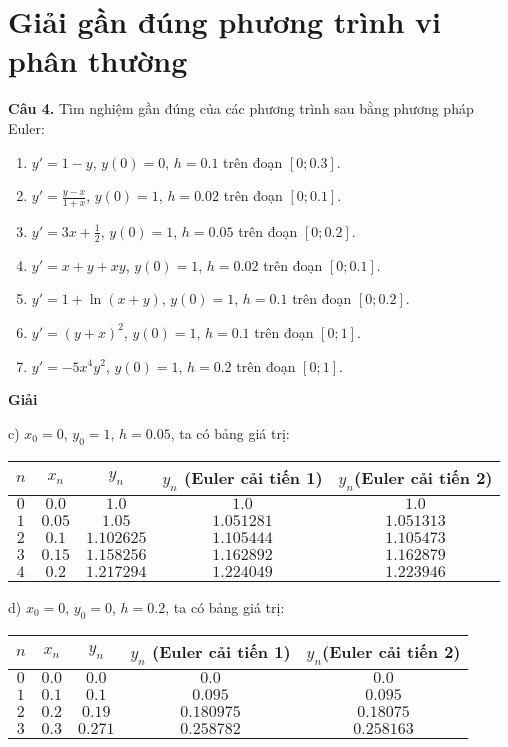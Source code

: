 \chapter{Giải gần đúng phương trình vi phân thường}

\textbf{Câu 4.} Tìm nghiệm gần đúng của các phương trình sau bằng phương pháp Euler:
\begin{enumerate}[label=\alph*)]
	\item $y'=1-y$, $y(0)=0$, $h=0.1$ trên đoạn $[0;0.3]$.
	\item $y'=\frac{y-x}{1+x}$, $y(0)=1$, $h=0.02$ trên đoạn $[0;0.1]$.
	\item $y'=3x+\frac12$, $y(0)=1$, $h=0.05$ trên đoạn $[0;0.2]$.
	\item $y'=x+y+xy$, $y(0)=1$, $h=0.02$ trên đoạn $[0;0.1]$.
	\item $y'=1+\ln(x+y)$, $y(0)=1$, $h=0.1$ trên đoạn $[0;0.2]$.
	\item $y'=(y+x)^2$, $y(0)=1$, $h=0.1$ trên đoạn $[0;1]$.
	\item $y'=-5x^4y^2$, $y(0)=1$, $h=0.2$ trên đoạn $[0;1]$.
\end{enumerate}

\textbf{Giải}\par

c) $x_0=0$, $y_0=1$, $h=0.05$, ta có bảng giá trị:
\begin{longtable}{|c|c|c|c|c|}\hline
$n$ & $x_n$ & $y_n$ & $y_n$ (Euler cải tiến 1) & $y_n$(Euler cải tiến 2) \\ \hline
$0$ & $0.0$ & $1.0$ & $1.0$ & $1.0$ \\ \hline
$1$ & $0.05$ & $1.05$ & $1.051281$ & $1.051313$ \\ \hline
$2$ & $0.1$ & $1.102625$ & $1.105444$ & $1.105473$ \\ \hline
$3$ & $0.15$ & $1.158256$ & $1.162892$ & $1.162879$ \\ \hline
$4$ & $0.2$ & $1.217294$ & $1.224049$ & $1.223946$ \\ \hline
\end{longtable}
d) $x_0=0$, $y_0=0$, $h=0.2$, ta có bảng giá trị:

\begin{longtable}{|c|c|c|c|c|}\hline
	$n$ & $x_n$ & $y_n$ & $y_n$ (Euler cải tiến 1) & $y_n$(Euler cải tiến 2) \\ \hline
	\endhead
	$0$ & $0.0$ & $0.0$ & $0.0$ & $0.0$ \\ \hline
	$1$ & $0.1$ & $0.1$ & $0.095$ & $0.095$ \\ \hline
	$2$ & $0.2$ & $0.19$ & $0.180975$ & $0.18075$ \\ \hline
	$3$ & $0.3$ & $0.271$ & $0.258782$ & $0.258163$ \\ \hline
\end{longtable}

